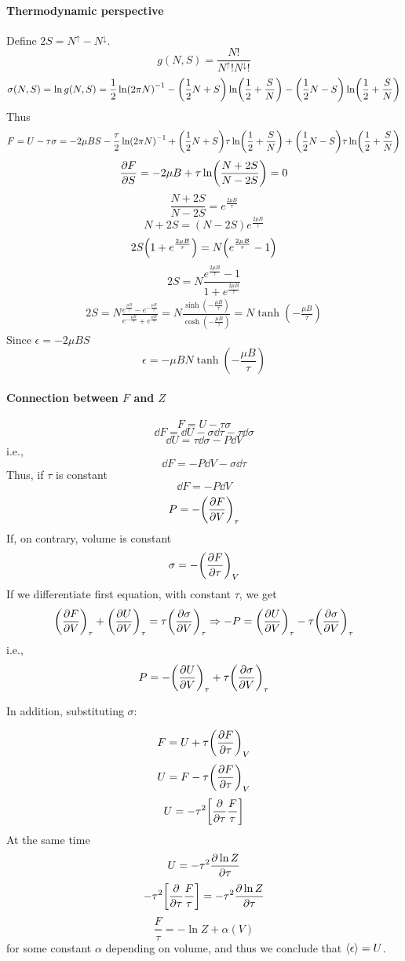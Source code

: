 \paragraph{Thermodynamic perspective}
Define $2S = N^{\uparrow} - N^{\downarrow}$.
$$g(N,S) = \frac{N!}{N^{\uparrow}! N^{\downarrow}!}$$
\begin{align*}
\sigma(N,S) = \ln g(N,S) = \frac{1}{2} \ln(2\pi N)^{-1} - \qty(\frac{1}{2}N+S) \ln(\frac{1}{2}+\frac{S}{N}) -\qty(\frac{1}{2}N-S ) \ln(\frac{1}{2} + \frac{S}{N})
\end{align*}
Thus
\begin{align*}
F = U -\tau \sigma = -2\mu BS - \frac{\tau}{2} \ln(2\pi N)^{-1}+ \qty(\frac{1}{2}N+S)\tau \ln(\frac{1}{2}+\frac{S}{N}) +\qty(\frac{1}{2}N-S )\tau \ln(\frac{1}{2} + \frac{S}{N})
\end{align*}
$$\pdv{F}{S} = -2\mu B +\tau \ln(\frac{N+2S}{N-2S}) = 0$$
$$\frac{N+2S}{N-2S} = e^{\frac{2\mu B}{\tau}}$$
$$N+2S = (N-2S)e^{\frac{2\mu B}{\tau}}$$
$$2S\qty(1+e^{\frac{2\mu B}{\tau}}) = N\qty(e^{\frac{2\mu B}{\tau}}-1)$$
$$2S = N\frac{e^{\frac{2\mu B}{\tau}}-1}{1+e^{\frac{2\mu B}{\tau}}}$$
\begin{align*}
2S = N\frac{e^{\frac{\mu B}{\tau}}-e^{-\frac{\mu B}{\tau}}}{e^{-\frac{\mu B}{\tau}}+e^{\frac{\mu B}{\tau}}} = N\frac{\sinh(-\frac{\mu B}{\tau})}{\cosh(-\frac{\mu B}{\tau})} =N \tanh(-\frac{\mu B}{\tau})
\end{align*}
Since $\epsilon = -2\mu B S$
$$\epsilon = -\mu B N  \tanh(-\frac{\mu B}{\tau})$$
\paragraph{Connection between $F$ and $Z$}
$$F = U -\tau \sigma$$
$$\dd{F} = \dd{U} -\sigma \dd{\tau} - \tau \dd{\sigma}$$
$$\dd{U} = \tau \dd{\sigma} - P\dd{V}$$
i.e.,
$$\dd{F} = -P\dd{V} - \sigma\dd{\tau}$$
Thus, if $\tau$ is constant
$$\dd{F} =- P\dd{V}$$
$$P = -\qty(\pdv{F}{V})_{\tau}$$
If, on contrary, volume is constant
$$\sigma = -\qty(\pdv{F}{\tau})_{V}$$
If we differentiate first equation, with constant $\tau$, we get
\begin{align*}
\qty(\pdv{F}{V})_{\tau} +\qty(\pdv{U}{V})_{\tau} = \tau\qty(\pdv{\sigma}{V})_{\tau} \Rightarrow -P = \qty(\pdv{U}{V})_{\tau} -\tau\qty(\pdv{\sigma}{V})_{\tau}
\end{align*}
i.e.,
$$P = -\qty(\pdv{U}{V})_{\tau} +\tau\qty(\pdv{\sigma}{V})_{\tau}$$

In addition, substituting $\sigma$:

$$F = U  + \tau\qty(\pdv{F}{\tau})_{V} $$
$$U = F - \tau\qty(\pdv{F}{\tau})_{V}$$
$$U =- \tau^2 \qty[ \pdv{\tau} \frac{F}{\tau}]$$
At the same time
$$U = -\tau^2 \pdv{\ln Z}{\tau}$$
$$- \tau^2 \qty[ \pdv{\tau} \frac{F}{\tau}]  = -\tau^2 \pdv{\ln Z}{\tau}$$
$$ \frac{F}{\tau}  = -\ln Z + \alpha(V)$$
for some constant $\alpha$ depending on volume, and thus we conclude that $\expval{\epsilon} = U$.